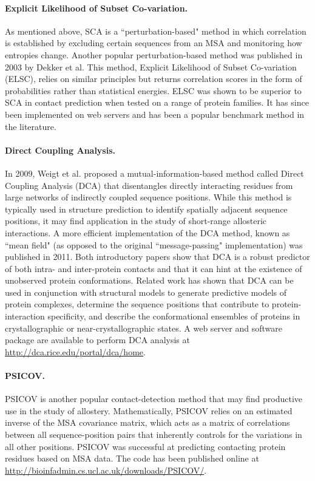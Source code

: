 \paragraph{Explicit Likelihood of Subset Co-variation.} As mentioned above, SCA is a ``perturbation-based" method in which correlation is established by excluding certain sequences from an MSA and monitoring how entropies change. Another popular perturbation-based method was published in 2003 by Dekker et al.\cite{Dekker2004} This method, Explicit Likelihood of Subset Co-variation (ELSC), relies on similar principles but returns correlation scores in the form of probabilities rather than statistical energies. ELSC was shown to be superior to SCA in contact prediction when tested on a range of protein families. It has since been implemented on web servers\cite{Yip2008,Kozma2012a} and has been a popular benchmark method in the literature.\cite{Halperin2006,Brown2010a,Ackerman2012,Pele2014a}
\paragraph{Direct Coupling Analysis.} In 2009, Weigt et al. proposed a mutual-information-based method called Direct Coupling Analysis (DCA) that disentangles directly interacting residues from large networks of indirectly coupled sequence positions.\cite{Weigt2008a} While this method is typically used in structure prediction to identify spatially adjacent sequence positions, it may find application in the study of short-range allosteric interactions. A more efficient implementation of the DCA method, known as ``mean field" (as opposed to the original ``message-passing" implementation) was published in 2011.\cite{Morcos2011a} Both introductory papers show that DCA is a robust predictor of both intra- and inter-protein contacts and that it can hint at the existence of unobserved protein conformations. Related work has shown that DCA can be used in conjunction with structural models to generate predictive models of protein complexes,\cite{Schug2009a,Sulkowska2012,Szurmant2013} determine the sequence positions that contribute to protein-interaction specificity,\cite{Procaccini2011a} and describe the conformational ensembles of proteins in crystallographic or near-crystallographic states.\cite{Morcos2013a} A web server and software package are available to perform DCA analysis at \url{http://dca.rice.edu/portal/dca/home}.
\paragraph{PSICOV.} PSICOV is another popular contact-detection method that may find productive use in the study of allostery.\cite{Jones2012a} Mathematically, PSICOV relies on an estimated inverse of the MSA covariance matrix, which acts as a matrix of correlations between all sequence-position pairs that inherently controls for the variations in all other positions. PSICOV was successful at predicting contacting protein residues based on MSA data. The code has been published online at \url{http://bioinfadmin.cs.ucl.ac.uk/downloads/PSICOV/}.
